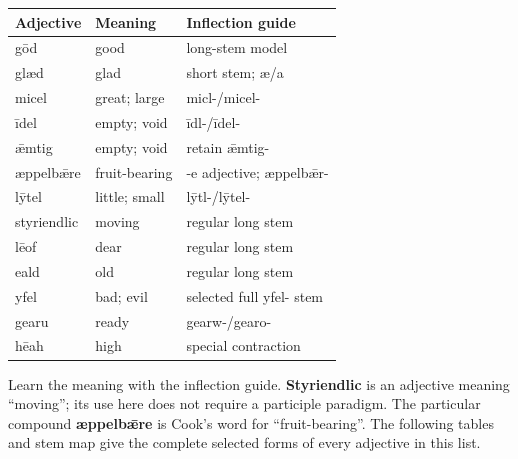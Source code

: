 \par\begingroup
\fontsize{10.5}{13.2}\selectfont
\setlength{\LTleft}{0pt}\setlength{\LTright}{\fill}
\noindent
\begin{tabular}{@{}>{\raggedright\arraybackslash}p{31.04mm}>{\raggedright\arraybackslash}p{36.68mm}>{\raggedright\arraybackslash}p{50.65mm}@{}}
\toprule
\textbf{Adjective} & \textbf{Meaning} & \textbf{Inflection guide} \\
\midrule
gōd & good & long-stem model \\
glæd & glad & short stem; æ/\allowbreak{}a \\
micel & great; large & micl-/\allowbreak{}micel- \\
īdel & empty; void & īdl-/\allowbreak{}īdel- \\
ǣmtig & empty; void & retain ǣmtig- \\
æppelbǣre & fruit-bearing & -e adjective; æppelbǣr- \\
lȳtel & little; small & lȳtl-/\allowbreak{}lȳtel- \\
styriendlic & moving & regular long stem \\
lēof & dear & regular long stem \\
eald & old & regular long stem \\
yfel & bad; evil & selected full yfel- stem \\
gearu & ready & gearw-/\allowbreak{}gearo- \\
hēah & high & special contraction \\
\bottomrule
\end{tabular}
\par\endgroup

Learn the meaning with the inflection guide. \textbf{Styriendlic} is an adjective meaning “moving”; its use here does not require a participle paradigm. The particular compound \textbf{æppelbǣre} is Cook’s word for “fruit-bearing”. The following tables and stem map give the complete selected forms of every adjective in this list.

